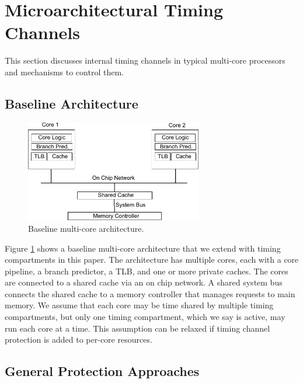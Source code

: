 \section{Microarchitectural Timing Channels}

This section discusses internal timing channels in typical
multi-core processors and mechanisms to control them.

\subsection{Baseline Architecture}

    \begin{figure}
        \begin{center}
            \includegraphics[width=3.04in]{figs/baseline.pdf}
            \caption{Baseline multi-core architecture.}
            \label{fig:baseline}
        \end{center}
    \end{figure}

Figure \ref{fig:baseline} shows a baseline multi-core architecture that we
extend with timing compartments in this paper. The architecture
has multiple cores, each with a core pipeline, a branch predictor, a TLB,
and one or more private caches. 
The cores are connected to a shared cache via an on chip network. A shared system 
bus connects the shared cache to a memory controller that manages requests to 
main memory.
We assume that each core may be time shared by multiple timing
compartments, but only one timing compartment, which we say is active, may run each core
at a time. This assumption can be relaxed if timing channel protection
is added to per-core resources.


\subsection{General Protection Approaches}
\label{sec:general_approaches}

